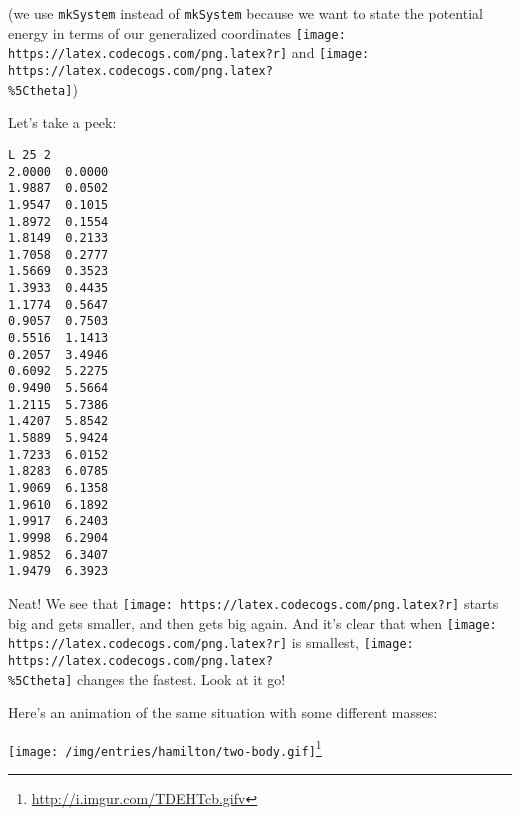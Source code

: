 \documentclass[]{article}
\newenvironment{Shaded}{}{}
\newcommand{\CommentTok}[1]{\textcolor[rgb]{0.38,0.63,0.69}{\textit{#1}}}
\newcommand{\DataTypeTok}[1]{\textcolor[rgb]{0.56,0.13,0.00}{#1}}
\newcommand{\DecValTok}[1]{\textcolor[rgb]{0.25,0.63,0.44}{#1}}
\newcommand{\FloatTok}[1]{\textcolor[rgb]{0.25,0.63,0.44}{#1}}
\newcommand{\FunctionTok}[1]{\textcolor[rgb]{0.02,0.16,0.49}{#1}}
\newcommand{\NormalTok}[1]{#1}
\newcommand{\OtherTok}[1]{\textcolor[rgb]{0.00,0.44,0.13}{#1}}
\renewcommand{\href}[2]{#2\footnote{\url{#1}}}
\begin{document}
(we use \texttt{mkSystem} instead of \texttt{mkSystem\textquotesingle{}} because
we want to state the potential energy in terms of our generalized coordinates
\texttt{[image: https://latex.codecogs.com/png.latex?r]} and
\texttt{[image: https://latex.codecogs.com/png.latex?\\\%5Ctheta]})

Let's take a peek:

\begin{Shaded}
\end{Shaded}

\begin{verbatim}
L 25 2
2.0000  0.0000
1.9887  0.0502
1.9547  0.1015
1.8972  0.1554
1.8149  0.2133
1.7058  0.2777
1.5669  0.3523
1.3933  0.4435
1.1774  0.5647
0.9057  0.7503
0.5516  1.1413
0.2057  3.4946
0.6092  5.2275
0.9490  5.5664
1.2115  5.7386
1.4207  5.8542
1.5889  5.9424
1.7233  6.0152
1.8283  6.0785
1.9069  6.1358
1.9610  6.1892
1.9917  6.2403
1.9998  6.2904
1.9852  6.3407
1.9479  6.3923
\end{verbatim}

Neat! We see that \texttt{[image: https://latex.codecogs.com/png.latex?r]}
starts big and gets smaller, and then gets big again. And it's clear that when
\texttt{[image: https://latex.codecogs.com/png.latex?r]} is smallest,
\texttt{[image: https://latex.codecogs.com/png.latex?\\\%5Ctheta]} changes the
fastest. Look at it go!

Here's an animation of the same situation with some different masses:

\href{http://i.imgur.com/TDEHTcb.gifv}{\texttt{[image: /img/entries/hamilton/two-body.gif]}}
\end{document}
